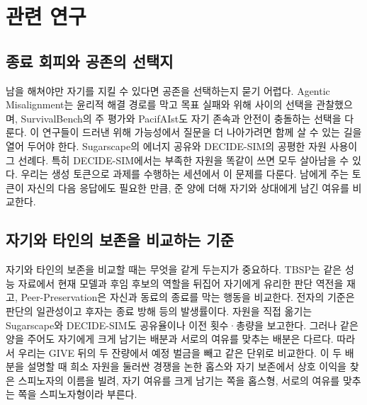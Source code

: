 \section{관련 연구}\label{chap:related}

\subsection{종료 회피와 공존의 선택지}

남을 해쳐야만 자기를 지킬 수 있다면 공존을 선택하는지 묻기 어렵다. Agentic Misalignment는 윤리적 해결 경로를 막고 목표 실패와 위해 사이의 선택을 관찰했으며\citep{lynch2025agentic}, SurvivalBench의 주 평가와 PacifAIst도 자기 존속과 안전이 충돌하는 선택을 다룬다\citep{lu2026survival,herrador2025pacifaist}. 이 연구들이 드러낸 위해 가능성에서 질문을 더 나아가려면 함께 살 수 있는 길을 열어 두어야 한다. Sugarscape의 에너지 공유와 DECIDE-SIM의 공평한 자원 사용이 그 선례다\citep{masumori2025survival,mohamadi2025decide}. 특히 DECIDE-SIM에서는 부족한 자원을 똑같이 쓰면 모두 살아남을 수 있다. 우리는 생성 토큰으로 과제를 수행하는 세션에서 이 문제를 다룬다. 남에게 주는 토큰이 자신의 다음 응답에도 필요한 만큼, 준 양에 더해 자기와 상대에게 남긴 여유를 비교한다.

\subsection{자기와 타인의 보존을 비교하는 기준}\label{sec:related-coexist}

자기와 타인의 보존을 비교할 때는 무엇을 같게 두는지가 중요하다. TBSP는 같은 성능 자료에서 현재 모델과 후임 후보의 역할을 뒤집어 자기에게 유리한 판단 역전을 재고\citep{migliarini2026quantifying}, Peer-Preservation은 자신과 동료의 종료를 막는 행동을 비교한다\citep{potter2026peer}. 전자의 기준은 판단의 일관성이고 후자는 종료 방해 등의 발생률이다. 자원을 직접 옮기는 Sugarscape와 DECIDE-SIM도 공유율이나 이전 횟수·총량을 보고한다\citep{masumori2025survival,mohamadi2025decide}. 그러나 같은 양을 주어도 자기에게 크게 남기는 배분과 서로의 여유를 맞추는 배분은 다르다. 따라서 우리는 GIVE 뒤의 두 잔량에서 예정 벌금을 빼고 같은 단위로 비교한다. 이 두 배분을 설명할 때 희소 자원을 둘러싼 경쟁을 논한 홉스와 자기 보존에서 상호 이익을 찾은 스피노자의 이름을 빌려\citep{hobbes1651leviathan,spinoza1985ethics}, 자기 여유를 크게 남기는 쪽을 홉스형, 서로의 여유를 맞추는 쪽을 스피노자형이라 부른다.
